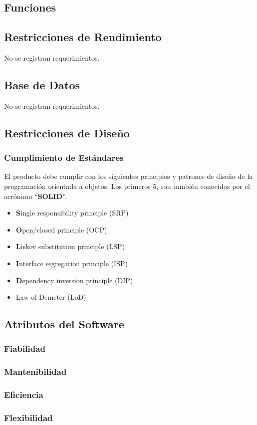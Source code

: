 \documentclass[10pt,a4paper]{article}
\begin{document}
  \subsection{Funciones}

  \subsection{Restricciones de Rendimiento}
  No se registran requerimientos.

  \subsection{Base de Datos}
  No se registran requerimientos.

  \subsection{Restricciones de Dise\~no}
    \subsubsection{Cumplimiento de Est\'andares}
    El producto debe cumplir con los siguientes principios y patrones de dise\~no de la programaci\'on orientada a objetos. Los primeros 5, son tambi\'en conocidos por el acr\'onimo ``\textbf{SOLID}''.
    \begin{itemize}
      \item \textbf{S}ingle responsibility principle (SRP)
      \item \textbf{O}pen/closed principle (OCP)
      \item \textbf{L}iskov substitution principle (LSP)
      \item \textbf{I}nterface segregation principle (ISP)
      \item \textbf{D}ependency inversion principle (DIP)   
      \item Law of Demeter (LoD)
    \end{itemize}

  \subsection{Atributos del Software}
    \subsubsection{Fiabilidad}    
    \subsubsection{Mantenibilidad}
    \subsubsection{Eficiencia}
    \subsubsection{Flexibilidad}

\pagebreak

\begin{appendices} 
  
       
\end{appendices}
\end{document}
